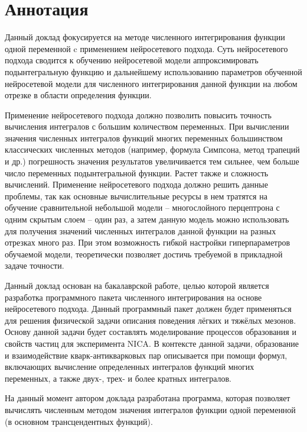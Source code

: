 \documentclass[a4paper,12pt]{article} %
\begin{document}



\section{Аннотация}

Данный доклад фокусируется на методе численного интегрирования функции одной переменной c применением нейросетевого подхода. Суть нейросетевого подхода сводится к обучению нейросетевой модели аппроксимировать подынтегральную функцию и дальнейшему использованию параметров обученной нейросетевой модели для численного интегрирования данной функции на любом отрезке в области определения функции.

Применение нейросетевого подхода должно позволить повысить точность вычисления интегралов с большим количеством переменных. При вычислении значения численных интегралов функций многих переменных большинством классических численных методов (например, формула Симпсона, метод трапеций и др.) погрешность значения результатов увеличивается тем сильнее, чем больше число переменных подынтегральной функции. Растет также и сложность вычислений. Применение нейросетевого подхода должно решить данные проблемы, так как основные вычислительные ресурсы в нем тратятся на обучение сравнительной небольшой модели – многослойного перцептрона с одним скрытым слоем – один раз, а затем данную модель можно использовать для получения значений численных интегралов данной функции на разных отрезках много раз. При этом возможность гибкой настройки гиперпараметров обучаемой модели, теоретически позволяет достичь требуемой в прикладной задаче точности.

Данный доклад основан на бакалаврской работе, целью которой является разработка программного пакета численного интегрирования на основе нейросетевого подхода. Данный программный пакет должен будет применяться для решения физической задачи описания поведения лёгких и тяжёлых мезонов. Основу данной задачи будет составлять моделирование процессов образования и свойств частиц для эксперимента NICA. В контексте данной задачи, образование и взаимодействие кварк-антикварковых пар описывается при помощи формул, включающих вычисление определенных интегралов функций многих переменных, а также двух-, трех- и более кратных интегралов.

На данный момент автором доклада разработана программа, которая позволяет вычислять численным методом значения интегралов функции одной переменной (в основном трансцендентных функций).
\end{document}
